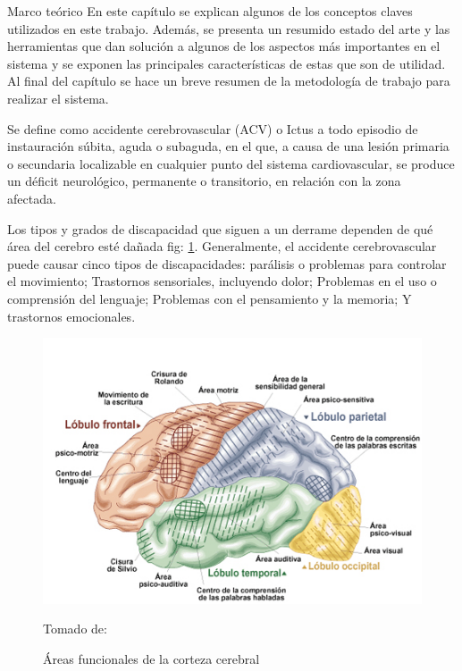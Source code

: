 \begin{thesischapter}{1} {Marco teórico}
    En este capítulo se explican algunos de los conceptos claves utilizados en este
    trabajo. Además, se presenta un resumido estado del arte y las herramientas que
    dan solución a algunos de los aspectos más importantes en el sistema y se exponen
    las principales características de estas que son de utilidad. Al final del capítulo se
    hace un breve resumen de la metodología de trabajo para realizar el sistema.

    
    \vspace{10pt}
    Se define como accidente cerebrovascular (ACV) o Ictus a todo episodio de
    instauración súbita, aguda o subaguda, en el que, a causa de una lesión primaria o
    secundaria localizable en cualquier punto del sistema cardiovascular, se produce un
    déficit neurológico, permanente o transitorio, en relación con la zona afectada.~\cite{ictus}

    \vspace{10pt}
    Los tipos y grados de discapacidad que siguen a un derrame dependen de qué área
    del cerebro esté dañada fig: \ref{fig: cerebralcortex}. Generalmente, el accidente cerebrovascular puede
    causar cinco tipos de discapacidades: parálisis o problemas para controlar el movimiento;
    Trastornos sensoriales, incluyendo dolor; Problemas en el uso o comprensión del
    lenguaje; Problemas con el pensamiento y la memoria; Y trastornos emocionales.~\cite{post-strok} 
    \begin{figure}[ht]
        \centering
        \includegraphics[scale=0.5]{images/brain.jpg}
        \caption{Áreas funcionales de la corteza cerebral}
        Tomado de: ~\cite{areacereabral}
        \label{fig: cerebralcortex}
    \end{figure}


\end{thesischapter}
